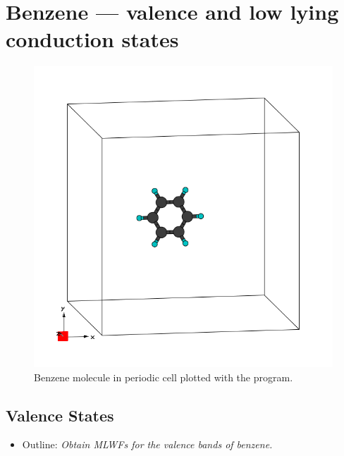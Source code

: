 \section{Benzene --- valence and low lying conduction states}
\label{sec12:benzene}

\begin{figure}[h!]
\centering
\includegraphics[width=0.25\columnwidth,trim={45pt 45pt 55pt 55pt},clip]{figure/example12/benzene.png}
\caption{Benzene molecule in periodic cell plotted with the \xcrysden{} program.}
\label{fig12.0}
\end{figure}

\subsection*{Valence States}
\begin{itemize}
\item Outline: {\it Obtain MLWFs for the valence bands of benzene.}
\end{itemize}


